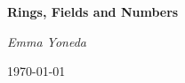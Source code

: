 \begin{titlepage}
	\centering
	{\Huge\bfseries Rings, Fields and Numbers\par}
    \vspace{0.5cm}
	{\Large\itshape Emma Yoneda\par}
	\vfill
	

	{\large \today\par}
\end{titlepage}
